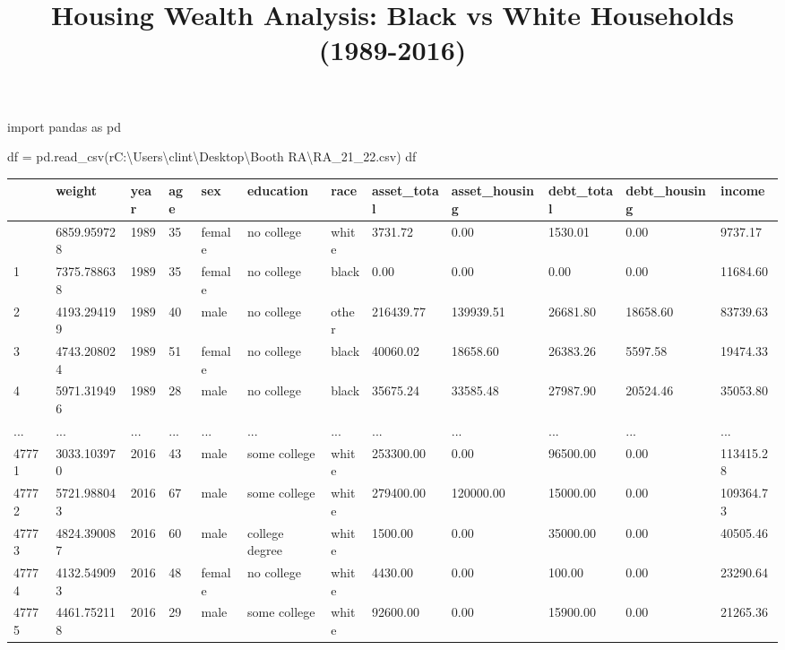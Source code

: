 \documentclass[
  letterpaper,
  DIV=11,
  numbers=noendperiod]{scrartcl}
\title{Housing Wealth Analysis: Black vs White Households (1989-2016)}
\author{}
\date{}
\newenvironment{Shaded}{\begin{snugshade}}{\end{snugshade}}
\newcommand{\ImportTok}[1]{\textcolor[rgb]{0.00,0.46,0.62}{#1}}
\newcommand{\NormalTok}[1]{\textcolor[rgb]{0.00,0.23,0.31}{#1}}
\newcommand{\OperatorTok}[1]{\textcolor[rgb]{0.37,0.37,0.37}{#1}}
\newcommand{\VerbatimStringTok}[1]{\textcolor[rgb]{0.13,0.47,0.30}{#1}}
\begin{document}
\maketitle

\begin{Shaded}
\begin{Highlighting}[]
\ImportTok{import}\NormalTok{ pandas }\ImportTok{as}\NormalTok{ pd}

\NormalTok{df }\OperatorTok{=}\NormalTok{ pd.read\_csv(}\VerbatimStringTok{r\textquotesingle{}C:\textbackslash{}Users\textbackslash{}clint\textbackslash{}Desktop\textbackslash{}Booth RA\textbackslash{}RA\_21\_22.csv\textquotesingle{}}\NormalTok{)}
\NormalTok{df}
\end{Highlighting}
\end{Shaded}

\begin{longtable}[]{@{}llllllllllll@{}}
\toprule\noalign{}
& weight & year & age & sex & education & race & asset\_total &
asset\_housing & debt\_total & debt\_housing & income \\
\midrule\noalign{}
\endhead
\bottomrule\noalign{}
\endlastfoot
0 & 6859.959728 & 1989 & 35 & female & no college & white & 3731.72 &
0.00 & 1530.01 & 0.00 & 9737.17 \\
1 & 7375.788638 & 1989 & 35 & female & no college & black & 0.00 & 0.00
& 0.00 & 0.00 & 11684.60 \\
2 & 4193.294199 & 1989 & 40 & male & no college & other & 216439.77 &
139939.51 & 26681.80 & 18658.60 & 83739.63 \\
3 & 4743.208024 & 1989 & 51 & female & no college & black & 40060.02 &
18658.60 & 26383.26 & 5597.58 & 19474.33 \\
4 & 5971.319496 & 1989 & 28 & male & no college & black & 35675.24 &
33585.48 & 27987.90 & 20524.46 & 35053.80 \\
... & ... & ... & ... & ... & ... & ... & ... & ... & ... & ... & ... \\
47771 & 3033.103970 & 2016 & 43 & male & some college & white &
253300.00 & 0.00 & 96500.00 & 0.00 & 113415.28 \\
47772 & 5721.988043 & 2016 & 67 & male & some college & white &
279400.00 & 120000.00 & 15000.00 & 0.00 & 109364.73 \\
47773 & 4824.390087 & 2016 & 60 & male & college degree & white &
1500.00 & 0.00 & 35000.00 & 0.00 & 40505.46 \\
47774 & 4132.549093 & 2016 & 48 & female & no college & white & 4430.00
& 0.00 & 100.00 & 0.00 & 23290.64 \\
47775 & 4461.752118 & 2016 & 29 & male & some college & white & 92600.00
& 0.00 & 15900.00 & 0.00 & 21265.36 \\
\end{longtable}
\end{document}
